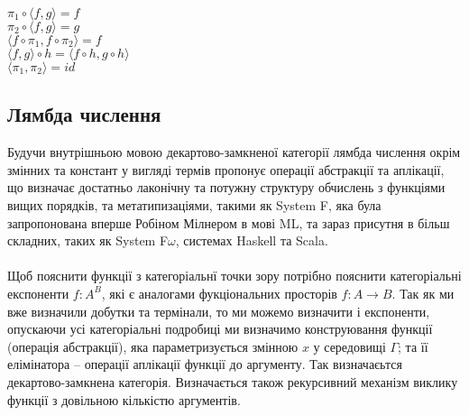 \begin{center}
$\pi_1 \circ \langle f, g \rangle = f$\\
$\pi_2 \circ \langle f, g \rangle = g$\\
$\langle f \circ \pi_1, f \circ \pi_2 \rangle = f$\\
$\langle f, g \rangle \circ h = \langle f \circ h, g \circ h \rangle$\\
$\langle \pi_1, \pi_2 \rangle = id$\\
\end{center}

\newpage

    \subsection{Лямбда числення}
    Будучи внутрішньою мовою декартово-замкненої категорії лямбда числення окрім змінних
    та констант у вигляді термів пропонує операції абстракції та аплікації, що визначає
    достатньо лаконічну та потужну структуру обчислень з функціями вищих порядків,
    та метатипизаціями, такими як System F, яка була запропонована
    вперше Робіном Мілнером в мові ML, та зараз присутня в більш складних,
    таких як System F$\omega$, системах Haskell та Scala.

    \paragraph{}
    Щоб пояснити функції з категоріальнї точки зору потрібно пояснити категоріальні
    експоненти $f : A^B$,  які є аналогами фукціональних просторів $f: A \rightarrow B$.
    Так як ми вже визначили добутки та термінали, то ми можемо визначити і експоненти,
    опускаючи усі категоріальні подробиці ми визначимо конструювання функції (операція абстракції),
    яка параметризується змінною $x$ у середовищі $\Gamma$; та її елімінатора -- операції аплікації
    функції до аргументу. Так визначаєьтся декартово-замкнена категорія.
    Визначається також рекурсивний механізм виклику функції
    з довільною кількістю аргументів.

